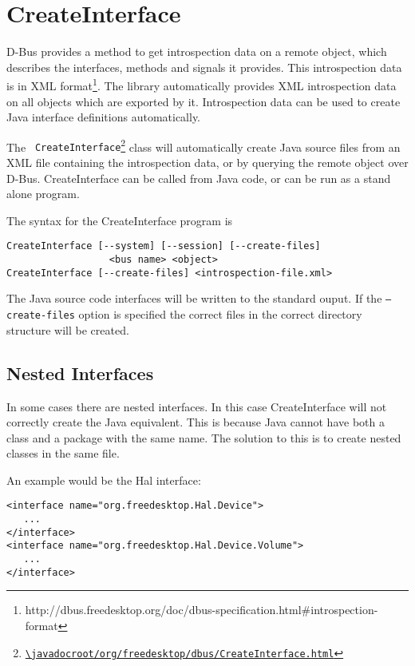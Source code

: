 \documentclass[a4paper,12pt]{article}
\begin{document}
\section{CreateInterface}
\label{sec:create}

D-Bus provides a method to get introspection data on a remote object, which
describes the interfaces, methods and signals it provides.  This introspection
data is in XML
format\footnote{http://dbus.freedesktop.org/doc/dbus-specification.html\#introspection-format}.
The library automatically provides XML introspection data on all objects which
are exported by it.  Introspection data can be used to create Java interface
definitions automatically.

The {\tt
CreateInterface\footnote{\url{\javadocroot/org/freedesktop/dbus/CreateInterface.html}}}
class will automatically create Java source files from an XML file
containing the introspection data, or by querying the remote object
over D-Bus.  CreateInterface can be called from Java code, or can be run as a
stand alone program.  

The syntax for the CreateInterface program is

\begin{verbatim}
CreateInterface [--system] [--session] [--create-files] 
                  <bus name> <object>
CreateInterface [--create-files] <introspection-file.xml>
\end{verbatim}

The Java source code interfaces will be written to the standard ouput. If the
{\tt --create-files} option is specified the correct files in the
correct directory structure will be created.

\subsection{Nested Interfaces}

In some cases there are nested interfaces. In this case CreateInterface will
not correctly create the Java equivalent. This is because Java cannot have both
a class and a package with the same name. The solution to this is to create
nested classes in the same file.

An example would be the Hal interface:

\begin{verbatim}
<interface name="org.freedesktop.Hal.Device">
   ...
</interface>
<interface name="org.freedesktop.Hal.Device.Volume">
   ...
</interface>
\end{verbatim}
\end{document}
